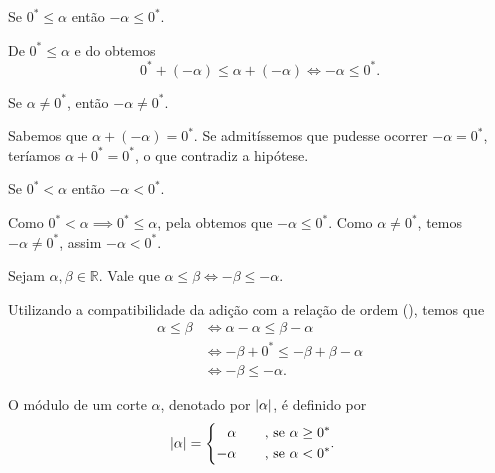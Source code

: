 \documentclass[../main.tex]{subfiles}
\begin{document}
\begin{prop}\label{reais-prop-xPositivoMenosxNegativo1}
    Se $0^* \leq \alpha$ então $-\alpha \leq 0^*$.
\end{prop}
\begin{dem}
    De $0^* \leq \alpha$ e do  obtemos \\ 
    \[ 0^* + (-\alpha) \leq \alpha + (-\alpha) \iff -\alpha \leq 0^*. \]
\end{dem}
\begin{prop}
    Se $\alpha \neq 0^*$, então $-\alpha \neq 0^*$.
\end{prop}
\begin{dem}
    Sabemos que $\alpha + (-\alpha) = 0^*$. Se admitíssemos que pudesse ocorrer $-\alpha = 0^*$, teríamos $\alpha + 0^* = 0^*$, o que contradiz a hipótese. 
\end{dem}
\begin{corol}\label{reais-corol-xPositivoMenosxNegativo1}
    Se $0^* < \alpha$ então $-\alpha < 0^*$.
\end{corol}
\begin{dem}
    Como $0^* < \alpha \implies 0^* \leq \alpha$, pela  obtemos que $-\alpha \leq 0^*$. Como $\alpha \neq 0^*$, temos $-\alpha \neq 0^*$, assim $-\alpha < 0^*$.
\end{dem}

\begin{teo}\label{reais-teo-desigualdadeSimetrico}
    Sejam $\alpha, \beta \in \mathbb{R}$. Vale que $\alpha \leq \beta \iff -\beta \leq -\alpha$.
\end{teo}
\begin{dem}
    Utilizando a compatibilidade da adição com a relação de ordem (), temos que 
    \begin{align*}
        \alpha \leq \beta
        &\iff \alpha - \alpha \leq \beta - \alpha \\
        &\iff -\beta + 0^* \leq - \beta + \beta - \alpha \\
        &\iff -\beta \leq -\alpha.
    \end{align*}
\end{dem}

\begin{defi}\label{reais-def-modulo1}
    O módulo de um corte $\alpha$, denotado por $\abs{\alpha}$, é definido por
    \begin{equation*}
        \abs{\alpha} = 
        \begin{cases}
        \begin{aligned}
             &\alpha \hspace{0.6cm} \text{ , se } \alpha \geq 0^* \\
            -&\alpha \hspace{0.6cm} \text{ , se } \alpha < 0^*
        \end{aligned}.
        \end{cases}            
    \end{equation*}
\end{defi}
\end{document}
